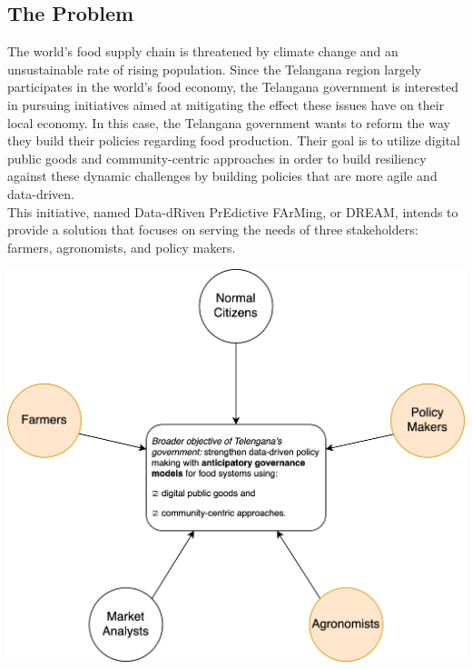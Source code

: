 \setcounter{goals_counter}{1}
\subsection{The Problem}
\begin{flushleft}
The world's food supply chain is threatened by climate change and an unsustainable rate of rising population. Since the Telangana region largely participates in the world's food economy, the Telangana government is interested in pursuing initiatives aimed at mitigating the effect these issues have on their local economy. In this case, the Telangana government wants to reform the way they build their policies regarding food production. Their goal is to utilize digital public goods and community-centric approaches in order to build resiliency against these dynamic challenges by building policies that are more agile and data-driven. 
\smallskip\\
This initiative, named Data-dRiven PrEdictive FArMing, or DREAM, intends to provide a solution that focuses on serving the needs of three stakeholders: farmers, agronomists, and policy makers.  %

\begin{center}
\includegraphics[scale=0.6]{../images_diagrams/stakeholders_in_broader_gov_objective.png}
\end{center}


\end{flushleft}
